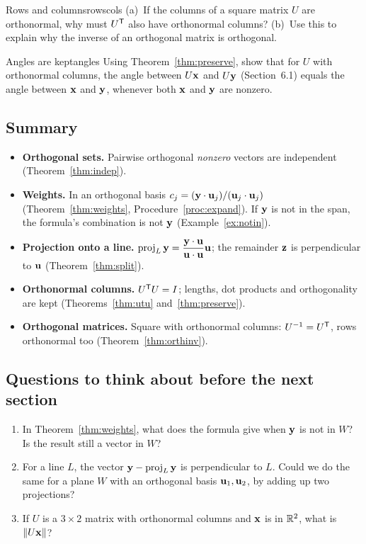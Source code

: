 \documentclass[11pt]{article}
\begin{document}
\begin{think}{Rows and columns}{rowscols}
(a)~If the columns of a square matrix $U$ are orthonormal, why must $U^{\mathsf T}$ also have orthonormal columns? (b)~Use this to explain why the inverse of an orthogonal matrix is orthogonal.
\end{think}

\begin{think}{Angles are kept}{angles}
Using Theorem~\ref{thm:preserve}, show that for $U$ with orthonormal columns, the angle between $U\mathbf{x}$ and $U\mathbf{y}$ (Section~6.1) equals the angle between $\mathbf{x}$ and $\mathbf{y}$, whenever both $\mathbf{x}$ and $\mathbf{y}$ are nonzero.
\end{think}

\subsection*{Summary}
\begin{itemize}
  \item \textbf{Orthogonal sets.} Pairwise orthogonal \emph{nonzero} vectors are independent (Theorem~\ref{thm:indep}).
  \item \textbf{Weights.} In an orthogonal basis $c_j=(\mathbf{y}\cdot\mathbf{u}_j)/(\mathbf{u}_j\cdot\mathbf{u}_j)$ (Theorem~\ref{thm:weights}, Procedure~\ref{proc:expand}). If $\mathbf{y}$ is not in the span, the formula's combination is not $\mathbf{y}$ (Example~\ref{ex:notin}).
  \item \textbf{Projection onto a line.} $\operatorname{proj}_L\mathbf{y}=\dfrac{\mathbf{y}\cdot\mathbf{u}}{\mathbf{u}\cdot\mathbf{u}}\mathbf{u}$; the remainder $\mathbf{z}$ is perpendicular to $\mathbf{u}$ (Theorem~\ref{thm:split}).
  \item \textbf{Orthonormal columns.} $U^{\mathsf T} U=I$; lengths, dot products and orthogonality are kept (Theorems~\ref{thm:utu} and~\ref{thm:preserve}).
  \item \textbf{Orthogonal matrices.} Square with orthonormal columns: $U^{-1}=U^{\mathsf T}$, rows orthonormal too (Theorem~\ref{thm:orthinv}).
\end{itemize}

\subsection*{Questions to think about before the next section}
\begin{enumerate}[nosep]
  \item In Theorem~\ref{thm:weights}, what does the formula give when $\mathbf{y}$ is not in $W$? Is the result still a vector in $W$?
  \item For a line $L$, the vector $\mathbf{y}-\operatorname{proj}_L\mathbf{y}$ is perpendicular to $L$. Could we do the same for a plane $W$ with an orthogonal basis $\mathbf{u}_1,\mathbf{u}_2$, by adding up two projections?
  \item If $U$ is a $3\times2$ matrix with orthonormal columns and $\mathbf{x}$ is in $\mathbb{R}^2$, what is $\lVert U\mathbf{x}\rVert$?
\end{enumerate}
\end{document}
